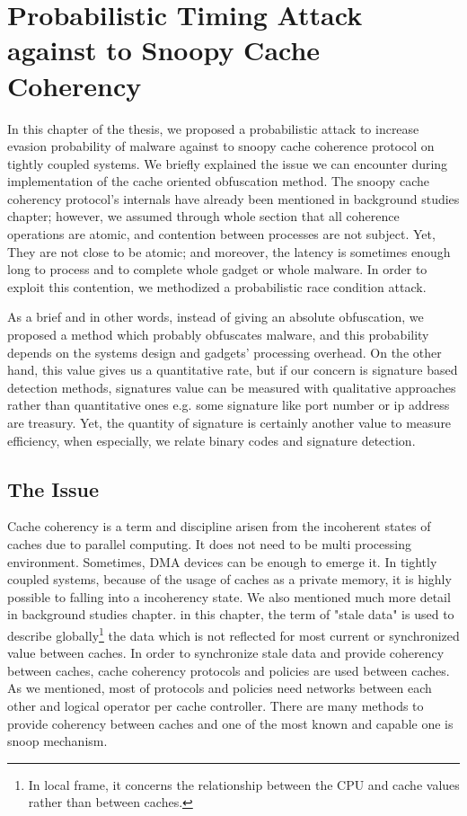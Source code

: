 \chapter{Probabilistic Timing Attack against to Snoopy Cache Coherency}
In this chapter of the thesis, we proposed a probabilistic attack to increase evasion probability of malware against to snoopy cache coherence protocol on tightly coupled systems. We briefly explained the issue we can encounter during implementation of the cache oriented obfuscation method. The snoopy cache coherency protocol's internals have already been mentioned in background studies chapter; however, we assumed through whole section that all coherence operations are atomic, and contention between processes are not subject. Yet, They are not close to be atomic; and moreover, the latency is sometimes enough long to process and to complete whole gadget or whole malware. In order to exploit this contention, we methodized a probabilistic race condition attack. 

As a brief and in other words, instead of giving an absolute obfuscation, we proposed a method which probably obfuscates malware, and this probability depends on the systems design and gadgets' processing overhead. On the other hand, this value gives us a quantitative rate, but if our concern is signature based detection methods, signatures value can be measured with qualitative approaches rather than quantitative ones e.g. some signature like port number or ip address are treasury.  Yet, the quantity of signature is certainly another value to measure efficiency, when especially, we relate binary codes and signature detection.

\section{The Issue}
Cache coherency is a term and discipline arisen from the incoherent states of caches due to parallel computing. It does not need to be multi processing environment. Sometimes, DMA devices can be enough to emerge it. In tightly coupled systems, because of the usage of caches as a private memory, it is highly possible to falling into a incoherency state. We also mentioned much more detail in background studies chapter. in this chapter, the term of "stale data" is used to describe globally\footnote{In local frame, it concerns the relationship between the CPU and cache values rather than between caches. } the data which is not reflected for most current or synchronized value between caches. In order to synchronize stale data and provide coherency between caches, cache coherency protocols and policies are used between caches. As we mentioned, most of  protocols and policies need networks between each other and logical operator per cache controller. There are many methods to provide coherency between caches and one of the most known and capable one is snoop mechanism. 

